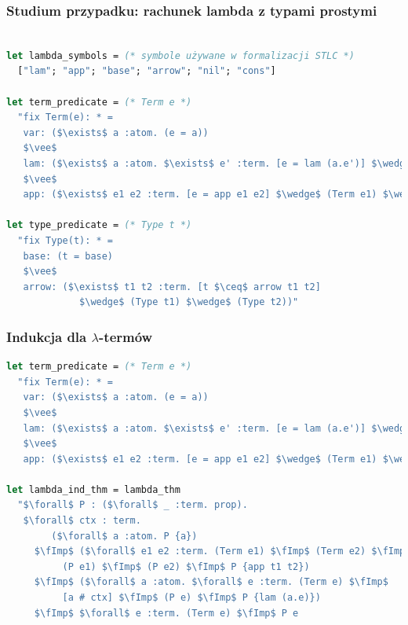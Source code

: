 \documentclass[aspectratio=169]{beamer}
\begin{document}
\begin{frame}[fragile]
\frametitle{Studium przypadku: rachunek lambda z typami prostymi}
\begin{lstlisting}[mathescape,language=OCaml,escapebegin=\color{codepurple}]

let lambda_symbols = (* symbole używane w formalizacji STLC *)
  ["lam"; "app"; "base"; "arrow"; "nil"; "cons"]

let term_predicate = (* Term e *)
  "fix Term(e): * =
   var: ($\exists$ a :atom. (e = a))
   $\vee$
   lam: ($\exists$ a :atom. $\exists$ e' :term. [e = lam (a.e')] $\wedge$ (Term e'))
   $\vee$
   app: ($\exists$ e1 e2 :term. [e = app e1 e2] $\wedge$ (Term e1) $\wedge$ (Term e2))"

let type_predicate = (* Type t *)
  "fix Type(t): * =
   base: (t = base)
   $\vee$
   arrow: ($\exists$ t1 t2 :term. [t $\ceq$ arrow t1 t2]
             $\wedge$ (Type t1) $\wedge$ (Type t2))"
\end{lstlisting}
\end{frame}

\begin{frame}[fragile]
\frametitle{Indukcja dla $\lambda$-termów}
\begin{lstlisting}[mathescape,language=OCaml,escapebegin=\color{codepurple}]
let term_predicate = (* Term e *)
  "fix Term(e): * =
   var: ($\exists$ a :atom. (e = a))
   $\vee$
   lam: ($\exists$ a :atom. $\exists$ e' :term. [e = lam (a.e')] $\wedge$ (Term e'))
   $\vee$
   app: ($\exists$ e1 e2 :term. [e = app e1 e2] $\wedge$ (Term e1) $\wedge$ (Term e2))"

let lambda_ind_thm = lambda_thm
  "$\forall$ P : ($\forall$ _ :term. prop).
   $\forall$ ctx : term.
        ($\forall$ a :atom. P {a})
     $\fImp$ ($\forall$ e1 e2 :term. (Term e1) $\fImp$ (Term e2) $\fImp$
          (P e1) $\fImp$ (P e2) $\fImp$ P {app t1 t2})
     $\fImp$ ($\forall$ a :atom. $\forall$ e :term. (Term e) $\fImp$
          [a # ctx] $\fImp$ (P e) $\fImp$ P {lam (a.e)})
     $\fImp$ $\forall$ e :term. (Term e) $\fImp$ P e
\end{lstlisting}
\end{frame}

\end{document}
